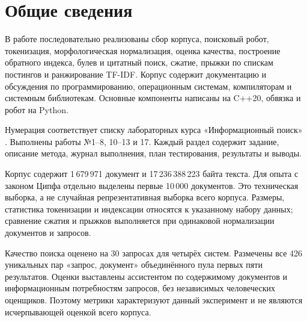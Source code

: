 \section*{Общие сведения}
В работе последовательно реализованы сбор корпуса, поисковый робот,
токенизация, морфологическая нормализация, оценка качества, построение
обратного индекса, булев и цитатный поиск, сжатие, прыжки по спискам
постингов и ранжирование TF-IDF. Корпус содержит документацию и обсуждения
по программированию, операционным системам, компиляторам и системным
библиотекам. Основные компоненты написаны на C++20, обвязка и робот на Python.

Нумерация соответствует списку лабораторных курса «Информационный поиск»
\cite{course}. Выполнены работы №1--8, 10--13 и 17.
Каждый раздел содержит задание, описание метода, журнал выполнения,
план тестирования, результаты и выводы.

Корпус содержит 1\,679\,971 документ и 17\,236\,388\,223 байта текста.
Для опыта с законом Ципфа отдельно выделены первые 10\,000 документов.
Это техническая выборка, а не случайная репрезентативная выборка всего корпуса.
Размеры, статистика токенизации и индексации относятся к указанному
набору данных; сравнение сжатия и прыжков выполняется при одинаковой
нормализации документов и запросов.

Качество поиска оценено на 30 запросах для четырёх систем.
Размечены все 426 уникальных пар «запрос, документ» объединённого пула
первых пяти результатов. Оценки выставлены ассистентом по содержимому
документов и информационным потребностям запросов, без независимых
человеческих оценщиков. Поэтому метрики характеризуют данный эксперимент
и не являются исчерпывающей оценкой всего корпуса.
